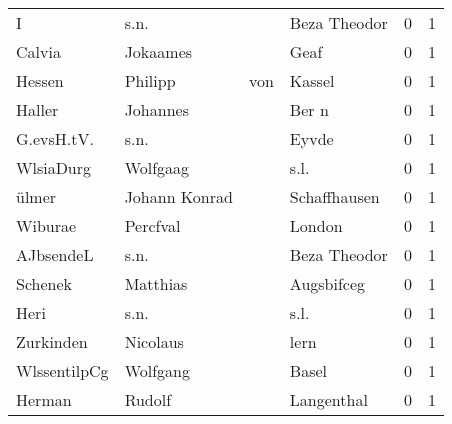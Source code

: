 \begin{center}
\begin{tiny}
\begin{longtabu}{llllrr}
                        I &                               s.n. &             &                                Beza Theodor &          0 &         1 \\
                   Calvia &                           Jokaames &             &                                        Geaf &          0 &         1 \\
                   Hessen &                            Philipp &         von &                                      Kassel &          0 &         1 \\
                   Haller &                           Johannes &             &                                       Ber n &          0 &         1 \\
               G.evsH.tV. &                               s.n. &             &                                       Eyvde &          0 &         1 \\
                WlsiaDurg &                           Wolfgaag &             &                                        s.l. &          0 &         1 \\
                    ülmer &                      Johann Konrad &             &                                Schaffhausen &          0 &         1 \\
                  Wiburae &                           Percfval &             &                                      London &          0 &         1 \\
                AJbsendeL &                               s.n. &             &                                Beza Theodor &          0 &         1 \\
                  Schenek &                           Matthias &             &                                  Augsbifceg &          0 &         1 \\
                     Heri &                               s.n. &             &                                        s.l. &          0 &         1 \\
                Zurkinden &                           Nicolaus &             &                                        lern &          0 &         1 \\
             WlssentilpCg &                           Wolfgang &             &                                       Basel &          0 &         1 \\
                   Herman &                             Rudolf &             &                                  Langenthal &          0 &         1 \\

\end{longtabu}
\end{tiny}
\end{center}
